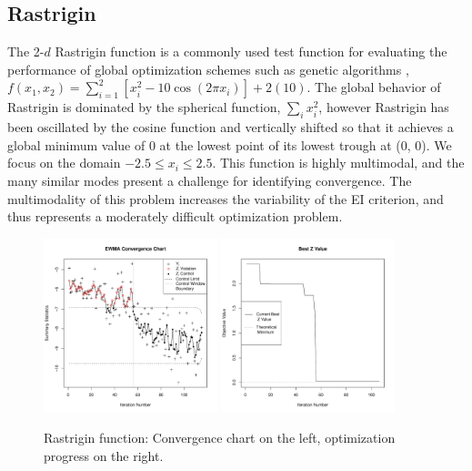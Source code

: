 \documentclass{article}
\begin{document}
%
%
\subsection{Rastrigin}
%
%

%
The 2-$d$ Rastrigin function is a commonly used test function for evaluating the 
performance of global optimization schemes such as genetic algorithms 
\citep{rastCite}, $f(x_1, x_2) = \sum_{i=1}^2\left[x_i^2-10\cos(2\pi x_i)\right] + 2(10)$.
The global behavior of Rastrigin is dominated by the 
spherical function, $\sum_i x_i^2$, however Rastrigin has been oscillated by 
the cosine function and vertically shifted so that it achieves a global 
minimum value of 0 at the lowest point of its lowest trough at (0, 0).
We focus on the domain $-2.5\le x_i\le 2.5$.
This function is highly multimodal, and the many
similar modes present a challenge for identifying convergence. The 
multimodality of this problem increases the variability of the EI criterion, 
and thus represents a moderately difficult optimization problem. 


%

%
%
\begin{figure}[!htb]
        \centering
        \includegraphics[width=0.45\textwidth]{./figures/ewmaConvChartRastHardEnd.pdf}
        \includegraphics[width=0.45\textwidth]{./figures/bestZRastHardEnd.pdf}
        \caption{Rastrigin function: Convergence chart on the left, optimization progress on the right.}
        \label{fig:rastrigin}
\end{figure}
%
%
\end{document}

